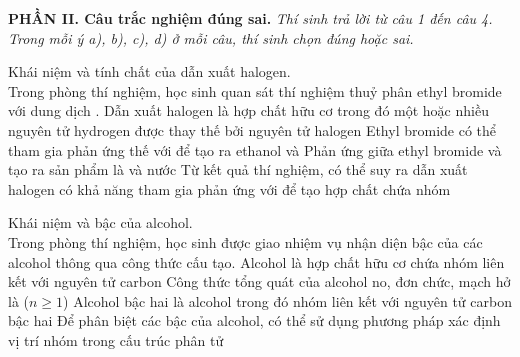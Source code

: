 \documentclass[12pt,a4paper]{article}
\begin{document}

\bigskip
\noindent\textbf{\large PHẦN II. Câu trắc nghiệm đúng sai.}
\textit{Thí sinh trả lời từ câu 1 đến câu 4. Trong mỗi ý a), b), c), d) ở mỗi câu, thí sinh chọn đúng hoặc sai.}
\vspace{0.2cm}

\begin{ex}
Khái niệm và tính chất của dẫn xuất halogen.\\
Trong phòng thí nghiệm, học sinh quan sát thí nghiệm thuỷ phân ethyl bromide với dung dịch .
\choiceTF
{\True Dẫn xuất halogen là hợp chất hữu cơ trong đó một hoặc nhiều nguyên tử hydrogen được thay thế bởi nguyên tử halogen}
{\True Ethyl bromide có thể tham gia phản ứng thế với  để tạo ra ethanol và }
{Phản ứng giữa ethyl bromide và  tạo ra sản phẩm là  và nước}
{\True Từ kết quả thí nghiệm, có thể suy ra dẫn xuất halogen có khả năng tham gia phản ứng với  để tạo hợp chất chứa nhóm }
\end{ex}

\begin{ex}
Khái niệm và bậc của alcohol.\\
Trong phòng thí nghiệm, học sinh được giao nhiệm vụ nhận diện bậc của các alcohol thông qua công thức cấu tạo.
\choiceTF
{Alcohol là hợp chất hữu cơ chứa nhóm  liên kết với nguyên tử carbon}
{\True Công thức tổng quát của alcohol no, đơn chức, mạch hở là  ($n \ge 1$)}
{\True Alcohol bậc hai là alcohol trong đó nhóm  liên kết với nguyên tử carbon bậc hai}
{\True Để phân biệt các bậc của alcohol, có thể sử dụng phương pháp xác định vị trí nhóm  trong cấu trúc phân tử}
\end{ex}
\end{document}
